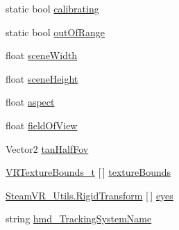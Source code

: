 \begin{DoxyCompactItemize}
\item 
static bool \mbox{\hyperlink{class_valve_1_1_v_r_1_1_steam_v_r_a0620766e7885e7fffdf1bdf508038a72}{calibrating}}
\item 
static bool \mbox{\hyperlink{class_valve_1_1_v_r_1_1_steam_v_r_a7bc04449525c5e7a08c5b4e176213145}{out\+Of\+Range}}
\item 
float \mbox{\hyperlink{class_valve_1_1_v_r_1_1_steam_v_r_a7df4ec5a0f2bcf39ef4fdf927331d552}{scene\+Width}}
\item 
float \mbox{\hyperlink{class_valve_1_1_v_r_1_1_steam_v_r_ab5c24a4287f97f08beff73ab02f0af18}{scene\+Height}}
\item 
float \mbox{\hyperlink{class_valve_1_1_v_r_1_1_steam_v_r_ae9a8d12812c86e7b54610af007e6f586}{aspect}}
\item 
float \mbox{\hyperlink{class_valve_1_1_v_r_1_1_steam_v_r_ac2e3b297c96238cbfd14dcf91b9bff02}{field\+Of\+View}}
\item 
Vector2 \mbox{\hyperlink{class_valve_1_1_v_r_1_1_steam_v_r_a1604204782f9234389de756d3a23ffd1}{tan\+Half\+Fov}}
\item 
\mbox{\hyperlink{struct_valve_1_1_v_r_1_1_v_r_texture_bounds__t}{V\+R\+Texture\+Bounds\+\_\+t}} \mbox{[}$\,$\mbox{]} \mbox{\hyperlink{class_valve_1_1_v_r_1_1_steam_v_r_a9d2e49d50ea742ea390a3e73b741a56f}{texture\+Bounds}}
\item 
\mbox{\hyperlink{struct_valve_1_1_v_r_1_1_steam_v_r___utils_1_1_rigid_transform}{Steam\+V\+R\+\_\+\+Utils.\+Rigid\+Transform}} \mbox{[}$\,$\mbox{]} \mbox{\hyperlink{class_valve_1_1_v_r_1_1_steam_v_r_a4dc5f4746e8fbe537e5e02d2f989be30}{eyes}}
\item 
string \mbox{\hyperlink{class_valve_1_1_v_r_1_1_steam_v_r_a308791a915ec09b90ad335e70b9b1350}{hmd\+\_\+\+Tracking\+System\+Name}}

\end{DoxyCompactItemize}

